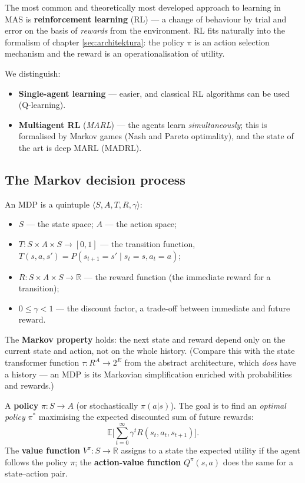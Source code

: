 \documentclass[11pt,a4paper]{article}
\theoremstyle{definition}
\begin{document}
The most common and theoretically most developed approach to learning in MAS
is \textbf{reinforcement learning} (RL) --- a change of behaviour by trial and error on the basis of
\emph{rewards} from the environment. RL fits naturally into the formalism of chapter
\ref{sec:architektura}: the policy $\pi$ is an action selection mechanism and the reward
is an operationalisation of utility.

We distinguish:
\begin{itemize}
\item \textbf{Single-agent learning} --- easier, and classical RL algorithms can be used (Q-learning).
\item \textbf{Multiagent RL} (\emph{MARL}) --- the agents learn \emph{simultaneously}; this is
  formalised by Markov games (Nash and Pareto optimality), and the state of the art is deep MARL
  (MADRL).
\end{itemize}
\subsection{The Markov decision process}

\begin{defbox}
An MDP is a quintuple $\langle S, A, T, R, \gamma\rangle$:
\begin{itemize}
\item $S$ --- the state space; $A$ --- the action space;
\item $T : S \times A \times S \to [0,1]$ --- the transition function,
  $T(s,a,s') = P(s_{t+1}=s' \mid s_t=s, a_t=a)$;
\item $R : S \times A \times S \to \mathbb{R}$ --- the reward function (the immediate reward for a
  transition);
\item $0 \le \gamma < 1$ --- the discount factor, a trade-off between immediate and future reward.
\end{itemize}
The \textbf{Markov property} holds: the next state and reward depend only on the current state
and action, not on the whole history. (Compare this with the state transformer function
$\tau : R^A \to 2^E$ from the abstract architecture, which \emph{does} have a history --- an MDP is
its Markovian simplification enriched with probabilities and rewards.)

A \textbf{policy} $\pi : S \to A$ (or stochastically $\pi(a|s)$).
The goal is to find an \emph{optimal policy} $\pi^*$ maximising the expected discounted sum of
future rewards:
\[
\mathbb{E}\Big[ \sum_{t=0}^{\infty} \gamma^t R(s_t, a_t, s_{t+1}) \Big].
\]
The \textbf{value function} $V^\pi : S \to \mathbb{R}$ assigns to a state the expected utility
if the agent follows the policy $\pi$; the \textbf{action-value function}
$Q^\pi(s,a)$ does the same for a state--action pair.
\end{defbox}
\end{document}
